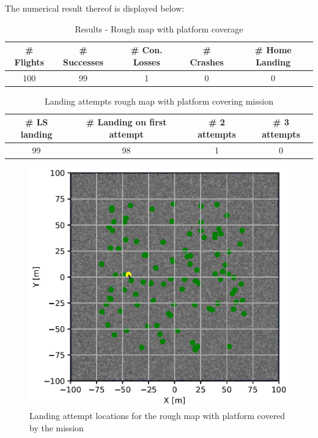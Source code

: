         The numerical result thereof is displayed below:

        \begin{table}[h]
            \begin{center}
             \caption{Results - Rough map with platform coverage}\vspace{1ex}
             \label{tab:result_rough_covered}
             \begin{tabular}{|c|c|c|c|c|}
             \hline
             \# Flights & \# Successes & \# Con. Losses & \# Crashes & \# Home Landing\\ \hline \hline
             100 & 99 & 1 & 0 & 0 \\
             \hline
             \end{tabular}
            \end{center}
        \end{table}

        \begin{table}[h]
            \begin{center}
             \caption{Landing attempts rough map with platform covering mission}\vspace{1ex}
             \label{tab:land_nums_rough_coverage}
             \begin{tabular}{|c|c|c|c|}
             \hline
             \# LS landing & \# Landing on first attempt & \# 2 attempts & \# 3 attempts\\ \hline \hline
             99 & 98 & 1 & 0 \\
             \hline
             \end{tabular}
            \end{center}
        \end{table}

        \begin{figure}[h]
        \centering
        \includegraphics[scale=0.5]{images/evaluation/landing_rough_covered.png}
        \caption{Landing attempt locations for the rough map with platform covered by the mission}
        \label{fig:land_rough_covered}
        \end{figure}

